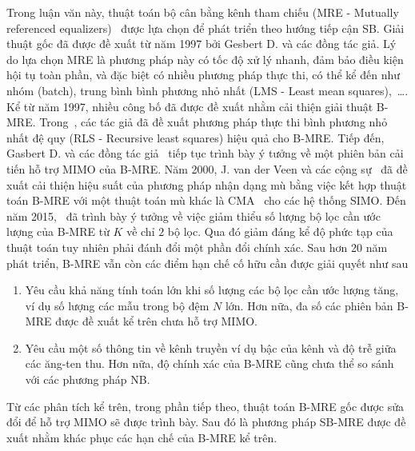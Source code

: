 Trong luận văn này, thuật toán bộ cân bằng kênh tham chiếu (MRE - Mutually referenced equalizers)~\cite{original} được lựa chọn để phát triển theo hướng tiếp cận SB. Giải thuật gốc đã được đề xuất từ năm 1997 bởi Gesbert D. và các đồng tác giả. Lý do lựa chọn MRE là phương pháp này có tốc độ xử lý nhanh, đảm bảo điều kiện hội tụ toàn phần, và đặc biệt có nhiều phương pháp thực thi, có thể kể đến như nhóm (batch), trung bình bình phương nhỏ nhất (LMS - Least mean squares),~\ldots. Kể từ năm 1997, nhiều công bố đã được đề xuất nhằm cải thiện giải thuật B-MRE. Trong~\cite{GesbertSPAWC}, các tác giả đã đề xuất phương pháp thực thi bình phương nhỏ nhất đệ quy (RLS - Recursive least squares) hiệu quả cho B-MRE. Tiếp đến, Gasbert D. và các đồng tác giả~\cite{Gesbert1997} tiếp tục trình bày ý tưởng về một phiên bản cải tiến hỗ trợ MIMO của B-MRE. Năm 2000, J. van der Veen và các cộng sự~\cite{Veen2000} đã đề xuất cải thiện hiệu suất của phương pháp nhận dạng mù bằng việc kết hợp thuật toán B-MRE với một thuật toán mù khác là CMA~\cite{Treichler1983} cho các hệ thống SIMO. Đến năm 2015,~\cite{Yu2015} đã trình bày ý tưởng về việc giảm thiểu số lượng bộ lọc cần ước lượng của B-MRE từ $K$ về chỉ $2$ bộ lọc. Qua đó giảm đáng kể độ phức tạp của thuật toán tuy nhiên phải đánh đổi một phần đổi chính xác. Sau hơn 20 năm phát triển, B-MRE vẫn còn các điểm hạn chế cố hữu cần được giải quyết như sau
\begin{enumerate}
    \item Yêu cầu khả năng tính toán lớn khi số lượng các bộ lọc cần ước lượng tăng, ví dụ số lượng các mẫu trong bộ đệm $N$ lớn. Hơn nữa, đa số các phiên bản B-MRE được đề xuất kể trên chưa hỗ trợ MIMO.
    \item Yêu cầu một số thông tin về kênh truyền ví dụ bậc của kênh và độ trễ giữa các ăng-ten thu. Hơn nữa, độ chính xác của B-MRE cũng chưa thể so sánh với các phương pháp NB.
\end{enumerate}

Từ các phân tích kể trên, trong phần tiếp theo, thuật toán B-MRE gốc được sửa đổi để hỗ trợ MIMO sẽ được trình bày. Sau đó là phương pháp SB-MRE được đề xuất nhằm khác phục các hạn chế của B-MRE kể trên.

